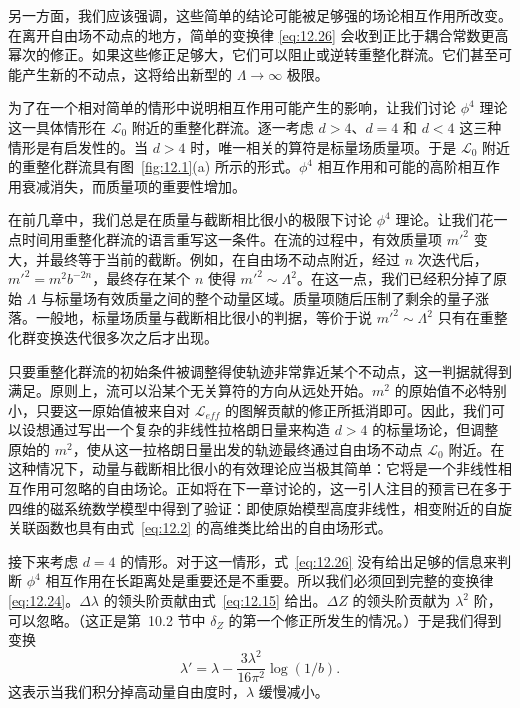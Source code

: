 另一方面，我们应该强调，这些简单的结论可能被足够强的场论相互作用所改变。在离开自由场不动点的地方，简单的变换律 \eqref{eq:12.26} 会收到正比于耦合常数更高幂次的修正。如果这些修正足够大，它们可以阻止或逆转重整化群流。它们甚至可能产生新的不动点，这将给出新型的 $\Lambda\to\infty$ 极限。

为了在一个相对简单的情形中说明相互作用可能产生的影响，让我们讨论 $\phi^4$ 理论这一具体情形在 $\mathcal{L}_0$ 附近的重整化群流。逐一考虑 $d > 4$、$d = 4$ 和 $d < 4$ 这三种情形是有启发性的。当 $d > 4$ 时，唯一相关的算符是标量场质量项。于是 $\mathcal{L}_0$ 附近的重整化群流具有图~\ref{fig:12.1}(a) 所示的形式。$\phi^4$ 相互作用和可能的高阶相互作用衰减消失，而质量项的重要性增加。

在前几章中，我们总是在质量与截断相比很小的极限下讨论 $\phi^4$ 理论。让我们花一点时间用重整化群流的语言重写这一条件。在流的过程中，有效质量项 $m'^2$ 变大，并最终等于当前的截断。例如，在自由场不动点附近，经过 $n$ 次迭代后，$m'^2 = m^2b^{-2n}$，最终存在某个 $n$ 使得 $m'^2 \sim \Lambda^2$。在这一点，我们已经积分掉了原始 $\Lambda$ 与标量场有效质量之间的整个动量区域。质量项随后压制了剩余的量子涨落。一般地，标量场质量与截断相比很小的判据，等价于说 $m'^2 \sim \Lambda^2$ 只有在重整化群变换迭代很多次之后才出现。

只要重整化群流的初始条件被调整得使轨迹非常靠近某个不动点，这一判据就得到满足。原则上，流可以沿某个无关算符的方向从远处开始。$m^2$ 的原始值不必特别小，只要这一原始值被来自对 $\mathcal{L}_{eff}$ 的图解贡献的修正所抵消即可。因此，我们可以设想通过写出一个复杂的非线性拉格朗日量来构造 $d > 4$ 的标量场论，但调整原始的 $m^2$，使从这一拉格朗日量出发的轨迹最终通过自由场不动点 $\mathcal{L}_0$ 附近。在这种情况下，动量与截断相比很小的有效理论应当极其简单：它将是一个非线性相互作用可忽略的自由场论。正如将在下一章讨论的，这一引人注目的预言已在多于四维的磁系统数学模型中得到了验证：即使原始模型高度非线性，相变附近的自旋关联函数也具有由式~\eqref{eq:12.2} 的高维类比给出的自由场形式。

接下来考虑 $d = 4$ 的情形。对于这一情形，式~\eqref{eq:12.26} 没有给出足够的信息来判断 $\phi^4$ 相互作用在长距离处是重要还是不重要。所以我们必须回到完整的变换律 \eqref{eq:12.24}。$\Delta\lambda$ 的领头阶贡献由式~\eqref{eq:12.15} 给出。$\Delta Z$ 的领头阶贡献为 $\lambda^2$ 阶，可以忽略。（这正是第~10.2 节中 $\delta_Z$ 的第一个修正所发生的情况。）于是我们得到变换
\begin{equation}
  \lambda' = \lambda - \frac{3\lambda^2}{16\pi^2}\log(1/b) .
  \label{eq:12.28}
\end{equation}
这表示当我们积分掉高动量自由度时，$\lambda$ 缓慢减小。


